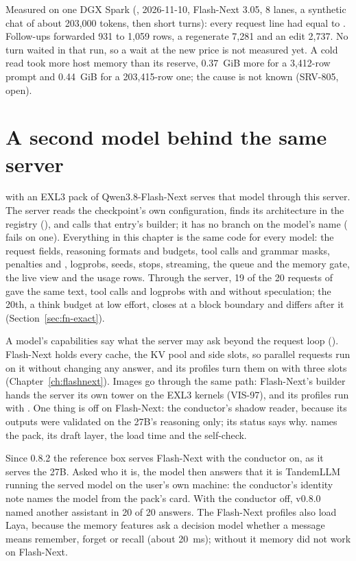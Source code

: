 Measured on one DGX Spark (\measured, 2026-11-10, Flash-Next 3.05, 8 lanes, a synthetic chat of about 203,000 tokens, then short turns): every request line had  equal to . Follow-ups forwarded 931 to 1,059 rows, a regenerate 7,281 and an edit 2,737. No turn waited in that run, so a wait at the new price is not measured yet. A cold read took more host memory than its reserve, 0.37~GiB more for a 3,412-row prompt and 0.44~GiB for a 203,415-row one; the cause is not known (SRV-805, open).

\section{A second model behind the same server}\label{sec:serving-flashnext}

 with an EXL3 pack of Qwen3.8-Flash-Next serves that model through this server. The server reads the checkpoint's own configuration, finds its architecture in the registry (), and calls that entry's builder; it has no branch on the model's name ( fails on one). Everything in this chapter is the same code for every model: the request fields, reasoning formats and budgets, tool calls and grammar masks, penalties and , logprobs, seeds, stops, streaming, the queue and the memory gate, the live view and the usage rows. Through the server, 19 of the 20 requests of  gave the same text, tool calls and logprobs with and without speculation; the 20th, a think budget at low effort, closes at a block boundary and differs after it (Section~\ref{sec:fn-exact}).

A model's capabilities say what the server may ask beyond the request loop (). Flash-Next holds every cache, the KV pool and side slots, so parallel requests run on it without changing any answer, and its profiles turn them on with three slots (Chapter~\ref{ch:flashnext}). Images go through the same path: Flash-Next's builder hands the server its own tower on the EXL3 kernels (VIS-97), and its profiles run with . One thing is off on Flash-Next: the conductor's shadow reader, because its outputs were validated on the 27B's reasoning only; its status says why.  names the pack, its draft layer, the load time and the self-check.

Since 0.8.2 the reference box serves Flash-Next with the conductor on, as it serves the 27B. Asked who it is, the model then answers that it is TandemLLM running the served model on the user's own machine: the conductor's identity note names the model from the pack's card. With the conductor off, v0.8.0 named another assistant in 20 of 20 answers. The Flash-Next profiles also load Laya, because the memory features ask a decision model whether a message means remember, forget or recall (about 20~ms); without it memory did not work on Flash-Next.

